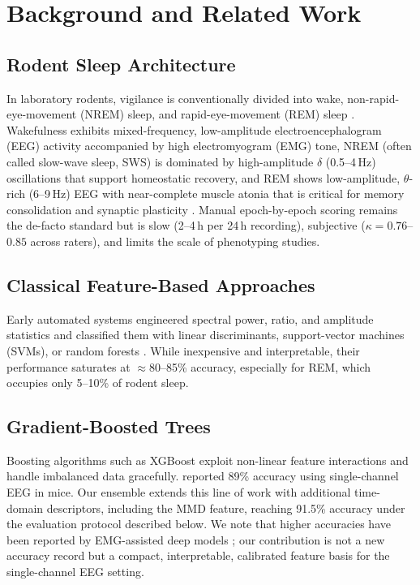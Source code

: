 \documentclass[letterpaper]{article} %
\begin{document}
\section{Background and Related Work}

\subsection{Rodent Sleep Architecture}
In laboratory rodents, vigilance is conventionally divided into wake, non-rapid-eye-movement (NREM) sleep, and rapid-eye-movement (REM) sleep \citep{rechtschaffen2002sleep}. Wakefulness exhibits mixed-frequency, low-amplitude electroencephalogram (EEG) activity accompanied by high electromyogram (EMG) tone, NREM (often called slow-wave sleep, SWS) is dominated by high-amplitude $\delta$ (0.5--4\,Hz) oscillations that support homeostatic recovery, and REM shows low-amplitude, $\theta$-rich (6--9\,Hz) EEG with near-complete muscle atonia that is critical for memory consolidation and synaptic plasticity \citep{walker2009role}. Manual epoch-by-epoch scoring remains the de-facto standard but is slow (2--4\,h per 24\,h recording), subjective ($\kappa = 0.76$--$0.85$ across raters), and limits the scale of phenotyping studies.

\subsection{Classical Feature-Based Approaches}
Early automated systems engineered spectral power, ratio, and amplitude statistics and classified them with linear discriminants, support-vector machines (SVMs), or random forests \citep{yaghouby2016_randomforest, mcsweeney2016_multi_cls}. While inexpensive and interpretable, their performance saturates at ${\approx}80$--85\% accuracy, especially for REM, which occupies only 5--10\% of rodent sleep.

\subsection{Gradient-Boosted Trees}
Boosting algorithms such as XGBoost \citep{Chen_2016} exploit non-linear feature interactions and handle imbalanced data gracefully. \citet{saevskiy2025_sensors} reported 89\% accuracy using single-channel EEG in mice. Our ensemble extends this line of work with additional time-domain descriptors, including the MMD feature, reaching 91.5\% accuracy under the evaluation protocol described below. We note that higher accuracies have been reported by EMG-assisted deep models \citep{jha2024_slumbernet}; our contribution is not a new accuracy record but a compact, interpretable, calibrated feature basis for the single-channel EEG setting.
\end{document}
